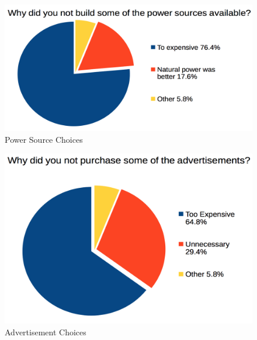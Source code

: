 \documentclass[msc,oneside]{ubcthesis}%
\begin{document}
\begin{figure}[hbt]
  \begin{center}
    \includegraphics[width=1\textwidth]{survey_pics/numeric/power_source}
    \caption[Power Source Choices]{Power Source Choices}\label{powerSources}
  \end{center}
\end{figure}

\begin{figure}[hbt]
  \begin{center}
    \includegraphics[width=1\textwidth]{survey_pics/numeric/adds}
    \caption[Advertisement Choices]{Advertisement Choices}\label{ads}
  \end{center}
\end{figure}
\end{document}
